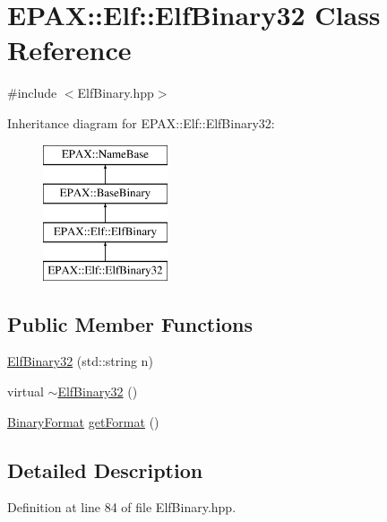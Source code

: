 \hypertarget{class_e_p_a_x_1_1_elf_1_1_elf_binary32}{\section{\-E\-P\-A\-X\-:\-:\-Elf\-:\-:\-Elf\-Binary32 \-Class \-Reference}
\label{class_e_p_a_x_1_1_elf_1_1_elf_binary32}
}


{\ttfamily \#include $<$\-Elf\-Binary.\-hpp$>$}

\-Inheritance diagram for \-E\-P\-A\-X\-:\-:\-Elf\-:\-:\-Elf\-Binary32\-:\begin{figure}[H]
\begin{center}
\leavevmode
\includegraphics[height=4.000000cm]{class_e_p_a_x_1_1_elf_1_1_elf_binary32}
\end{center}
\end{figure}
\subsection*{\-Public \-Member \-Functions}
\begin{DoxyCompactItemize}
\item 
\hyperlink{class_e_p_a_x_1_1_elf_1_1_elf_binary32_a745eda06077bee1c3968ac6d8185d86e}{\-Elf\-Binary32} (std\-::string n)
\item 
virtual \hyperlink{class_e_p_a_x_1_1_elf_1_1_elf_binary32_a44ba58a5202e5fda219d6008ff90d153}{$\sim$\-Elf\-Binary32} ()
\item 
\hyperlink{namespace_e_p_a_x_a4be639c006ef14def4708b37ee6dd67d}{\-Binary\-Format} \hyperlink{class_e_p_a_x_1_1_elf_1_1_elf_binary32_ad3c232fe03109e9a59e5456420d4fed3}{get\-Format} ()
\end{DoxyCompactItemize}


\subsection{\-Detailed \-Description}


\-Definition at line 84 of file \-Elf\-Binary.\-hpp.



